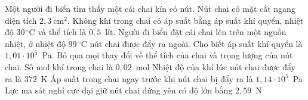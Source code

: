 	\begin{ex}%
		Một người đi biển tìm thấy một cái chai kín có nút. Nút chai có mặt cắt ngang diện tích $2{,}3~\text{cm}^2$. Không khí trong chai có áp suất bằng áp suất khí quyển, nhiệt độ $30\,^\circ\text{C}$ và thể tích là $0{,}5$~lít. Người đi biển đặt cái chai lên trên một nguồn nhiệt, ở nhiệt độ $99\,^\circ\text{C}$ nút chai được đẩy ra ngoài. Cho biết áp suất khí quyển là $1{,}01\cdot 10^5$~Pa. Bỏ qua mọi thay đổi về thể tích của chai và trọng lượng của nút chai.
		\choiceTFt
		{\True Số mol khí trong chai là $0{,}02$~mol}
		{\True Nhiệt độ của khí lúc nút chai được đẩy ra là $372$~K}
		{Áp suất trong chai ngay trước khi nút chai bị đẩy ra là $1{,}14\cdot 10^5$~Pa}
		{Lực ma sát nghỉ cực đại giữ nút chai đứng yên có độ lớn bằng $2{,}59$~N}
	\end{ex}

